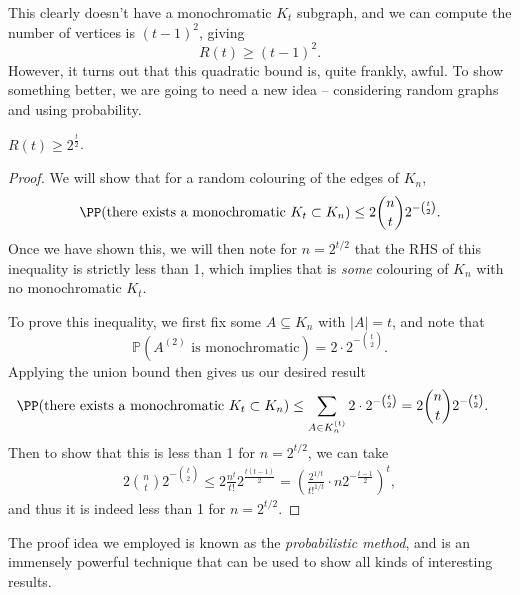 \begin{center}

\end{center}

This clearly doesn't have a monochromatic $K_t$ subgraph, and we can compute the number of vertices is $(t - 1)^2$, giving
$$
R(t) \geq (t - 1)^2.
$$
However, it turns out that this quadratic bound is, quite frankly, awful. To show something better, we are going to need a new idea -- considering random graphs and using probability.

\begin{theorem}[Erdős]
	$R(t) \geq 2^{\frac t2}$.
\end{theorem}
\begin{proof}
	We will show that for a random colouring of the edges of $K_n$,
	$$
	\PP(\text{there exists a monochromatic $K_t \subset K_n$}) \leq 2 \binom{n}{t} 2^{-\binom{t}{2}}.
	$$
	Once we have shown this, we will then note for $n = 2^{t/2}$ that the RHS of this inequality is strictly less than 1, which implies that is \emph{some} colouring of $K_n$ with no monochromatic $K_t$.

	To prove this inequality, we first fix some $A \subseteq K_n$ with $|A| = t$, and note that
	$$
\mathbb{P}(A^{(2)}\text{ is monochromatic}) = 2 \cdot 2^{-\binom{t}{2}}.
	$$
	Applying the union bound then gives us our desired result
	\begin{align*}
		\PP(\text{there exists a monochromatic $K_t \subset K_n$}) &\leq \sum_{A \in K_n^{(t)}} 2 \cdot 2^{-\binom{t}{2}} = 2 \binom{n}{t} 2^{-\binom{t}{2}}.
	\end{align*}
	Then to show that this is less than 1 for $n = 2^{t/2}$, we can take
	\begin{align*}
		2 \binom{n}{t} 2^{-\binom{t}{2}} \leq 2 \frac{n^t}{t!}2^{\frac{t(t-1)}{2}} = \left(\frac{2^{1/t}}{t!^{1/t}} \cdot n 2^{-\frac{t - 1}{2}}\right)^t,
	\end{align*}
	and thus it is indeed less than 1 for $n = 2^{t/2}$.
\end{proof}

The proof idea we employed is known as the \emph{probabilistic method}, and is an immensely powerful technique that can be used to show all kinds of interesting results.

